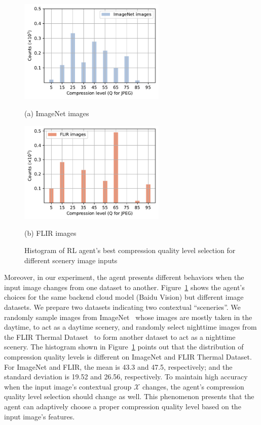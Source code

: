 \begin{figure}[!t]
	{\color{revise}
		\begin{minipage}[t]{0.48\linewidth}
			\centerline{\includegraphics[width=7cm]{figures/ImageNet_Baidu_choices.pdf}}
			\centerline{(a) ImageNet images}
		\end{minipage}
		\hfill
		\begin{minipage}[t]{0.48\linewidth}
			\centerline{\includegraphics[width=7cm]{figures/FLIR_Baidu_choices.pdf}}
			\centerline{(b) FLIR images}
		\end{minipage}	
		\caption{\textcolor{revise}{Histogram of RL agent's best compression quality level selection for different scenery image inputs}}
		\label{fig: dataset_change}
	}
	\vspace{-0.2cm} 
\end{figure}

Moreover, in our experiment, the agent presents different behaviors when the input image changes from one dataset to another. Figure~\ref{fig: dataset_change} shows the agent's choices for the same backend cloud model (Baidu Vision) but different image datasets. We prepare two datasets indicating two contextual ``sceneries''. We randomly sample images from ImageNet~\cite{ImageNet} whose images are mostly taken in the daytime, to act as a daytime scenery, and randomly select nighttime images from the FLIR Thermal Dataset~\cite{FLIR} to form another dataset to act as a nighttime scenery. \textcolor{revise}{The histogram shown in Figure~\ref{fig: dataset_change} points out that the distribution of compression quality levels is different on ImageNet and FLIR Thermal Dataset. For ImageNet and FLIR, the mean is 43.3 and 47.5, respectively; and the standard deviation is 19.52 and 26.56, respectively.} To maintain high accuracy when the input image's contextual group $ \mathcal{X} $ changes, the agent's compression quality level selection should change as well. This phenomenon presents that the agent can adaptively choose a proper compression quality level based on the input image's features.

